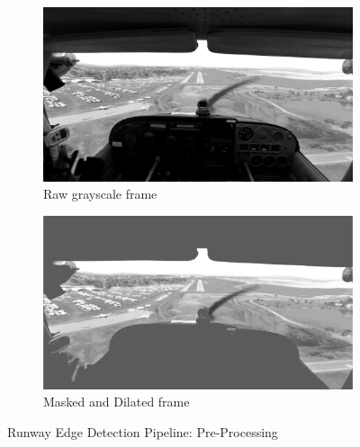 \documentclass[letterpaper, conference]{IEEEtran}  %
\begin{document}
\begin{figure}
\centering
\begin{subfigure}{\textwidth}
	\includegraphics[width=\columnwidth]{raw.png} 
	\caption{\label{fig:raw} Raw grayscale frame}
\end{subfigure}
\begin{subfigure}{\textwidth}
    \centering
	\includegraphics[width=\columnwidth]{mskdilated.png} 
	\caption{\label{fig:msk} Masked and Dilated frame}
\end{subfigure}
\caption{Runway Edge Detection Pipeline: Pre-Processing}
\end{figure}
\end{document}
